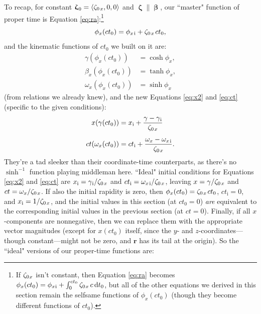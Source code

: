 \documentclass[12pt]{article}
\renewcommand{\vv}[1]{\mathbf{#1}}
\newcommand{\dd}[1]{\mathrm{d}#1}
\newcommand{\vvbeta}{\bm{\upbeta}}
\newcommand{\vvzeta}{\bm{\upzeta}}
\begin{document}
To recap, for constant $\vvzeta_{\mkern1mu 0} = \langle \zeta_{0 \mkern2mu x} , 0, 0 \rangle$ and $\vvzeta \parallel \vvbeta$, our ``master" function of proper time is Equation \ref{eq:ra}:\footnote{If $\zeta_{0 \mkern1mu x}$ isn't constant, then Equation \ref{eq:ra} becomes $\phi_x (ct_0) = \phi_{x \mkern1mu \textrm{i} } + \int_0^{ct_0} \zeta_{0 \mkern1mu x} \, c \, \dd t_0$, but all of the other equations we derived in this section remain the selfsame functions of $\phi_x (ct_0)$ (though they become different functions of $ct_0$).}
\begin{equation*}
\phi_x (ct_0) = \phi_{x \mkern2mu \textrm{i} } + \zeta_{0 \mkern2mu x} \mkern2mu ct_0 ,
\end{equation*}
and the kinematic functions of $ct_0$ we built on it are:
\begin{equation*}
\begin{aligned}
\gamma (\phi_x(ct_0)) &= \cosh{\phi_x }  , \\[3pt]
\beta_x (\phi_x(ct_0)) &= \tanh{\phi_x }  , \\[3pt]
\omega_x (\phi_x(ct_0)) &= \sinh{\phi_x } 
\end{aligned}
\end{equation*}
(from relations we already knew), and the new Equations \ref{eq:x2} and \ref{eq:ct} (specific to the given conditions):
\begin{equation*}
\begin{aligned}
x(\gamma(ct_0)) &= x_{\mathrm{i}} + \dfrac{\gamma - \gamma_{\mkern1mu \mathrm{i}}}{ \zeta_{0 \mkern2mu x}} \\[5pt]
ct(\omega_x(ct_0)) &= ct_{\mathrm{i}} + \dfrac{\omega_x - \omega_{x \mkern2mu \textrm{i} }}{ \zeta_{0 \mkern2mu x}} .
\end{aligned}
\end{equation*}
They're a tad sleeker than their coordinate-time counterparts, as there's no $\sinh^{-1}$ function playing middleman here. ``Ideal" initial conditions for Equations \ref{eq:x2} and \ref{eq:ct} are $x_{\mathrm{i}} = \gamma_{\mkern1mu \mathrm{i}} / \zeta_{0 \mkern2mu x}$ and $ct_{\mathrm{i}} = \omega_{x \mkern2mu \textrm{i} } / \zeta_{0 \mkern2mu x}$, leaving $x = \gamma / \zeta_{0 \mkern2mu x}$ and $ct = \omega_x / \zeta_{0 \mkern2mu x}$. If also the initial rapidity is zero, then $\phi_x (ct_0) = \zeta_{0 \mkern2mu x} \mkern2mu ct_0$, $ct_{\mathrm{i}} = 0$, and $x_{\mathrm{i}} = 1 / \zeta_{0 \mkern2mu x}$, and the initial values in this section (at $ct_0 = 0$) \emph{are} equivalent to the corresponding initial values in the previous section (at $ct = 0$). Finally, if all $x$-components are nonnegative, then we can replace them with the appropriate vector magnitudes (except for $x (ct_0)$ itself, since the $y$- and $z$-coordinates---though constant---might not be zero, and $\vv r$ has its tail at the origin). So the ``ideal" versions of our proper-time functions are:
\end{document}
